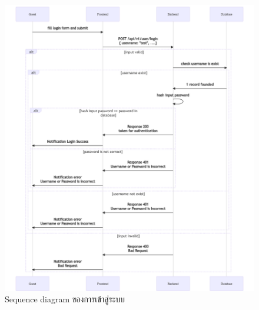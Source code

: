 \documentclass[12pt,oneside,openright,a4paper]{cpe-thai-project}
\begin{document}
\begin{figure}[!ht]\centering
  \includegraphics[width=\textwidth]{./img/seq_login.png}
  \caption{Sequence diagram ของการเข้าสู่ระบบ}\label{fig:seq_login} 
\end{figure} 
\end{document}
